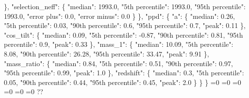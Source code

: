 {{        \}, %
        "selection\_neff": \{%
          "median": 1993.0, %
          "5th percentile": 1993.0, %
          "95th percentile": 1993.0, %
          "error plus": 0.0, %
          "error minus": 0.0%
        \}%
      \}, %
      "ppd": \{%
        "a": \{%
          "median": 0.26, %
          "5th percentile": 0.03, %
          "90th percentile": 0.6, %
          "95th percentile": 0.7, %
          "peak": 0.11%
        \}, %
        "cos\_tilt": \{%
          "median": 0.09, %
          "5th percentile": {-}0.87, %
          "90th percentile": 0.81, %
          "95th percentile": 0.9, %
          "peak": 0.33%
        \}, %
        "mass\_1": \{%
          "median": 10.09, %
          "5th percentile": 8.08, %
          "90th percentile": 26.28, %
          "95th percentile": 33.47, %
          "peak": 9.91%
        \}, %
        "mass\_ratio": \{%
          "median": 0.84, %
          "5th percentile": 0.51, %
          "90th percentile": 0.97, %
          "95th percentile": 0.99, %
          "peak": 1.0%
        \}, %
        "redshift": \{%
          "median": 0.3, %
          "5th percentile": 0.05, %
          "90th percentile": 0.44, %
          "95th percentile": 0.45, %
          "peak": 2.0%
        \}%
      \}%
    \}}%
  \else%
    \ifnum{}=0%
      \def\MagTruncnormIidTiltIsotropicTruncnormNid@out{%
    {-}1032.3}%
    \else%
      \ifnum{}=0%
      \def\MagTruncnormIidTiltIsotropicTruncnormNid@out{%
    0.24}%
    \else%
      \ifnum{}=0%
      \def\MagTruncnormIidTiltIsotropicTruncnormNid@out{%
    0.0}%
    \else%
      \ifnum{}=0%
      \def\MagTruncnormIidTiltIsotropicTruncnormNid@out{%
    0.65}%
    \else%
      \ifnum{}=0%
      \let\MagTruncnormIidTiltIsotropicTruncnormNid@out\MagTruncnormIidTiltIsotropicTruncnormNid@I%
    \else%
      \ifnum{}=0%
      \let\MagTruncnormIidTiltIsotropicTruncnormNid@out\MagTruncnormIidTiltIsotropicTruncnormNid@II%
    \else%
      \def\MagTruncnormIidTiltIsotropicTruncnormNid@out{%
    ??}%
    \fi\fi\fi\fi\fi\fi
  \fi
  \MagTruncnormIidTiltIsotropicTruncnormNid@out
}\newcommand\MagTruncnormIidTiltIsotropicTruncnormNid@I[1][all]{%
  \ifnum\pdfstrcmp{#1}{all}=0%
    \def\MagTruncnormIidTiltIsotropicTruncnormNid@I@out{%
    \{%
      "alpha\_1": \{%
        "median": 1.88, %
        "5th percentile": 0.07, %
        "95th percentile": 3.09, %
        "error plus": 1.21, %
        "error minus": 1.81%
      \}, %
}}
